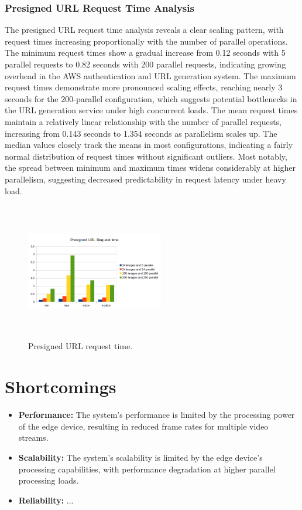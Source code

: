 \documentclass[conference]{IEEEtran}
\begin{document}
\subsubsection{Presigned URL Request Time Analysis}
The presigned URL request time analysis reveals a clear scaling pattern, with request times increasing proportionally with the number of parallel operations. The minimum request times show a gradual increase from 0.12 seconds with 5 parallel requests to 0.82 seconds with 200 parallel requests, indicating growing overhead in the AWS authentication and URL generation system. The maximum request times demonstrate more pronounced scaling effects, reaching nearly 3 seconds for the 200-parallel configuration, which suggests potential bottlenecks in the URL generation service under high concurrent loads. The mean request times maintain a relatively linear relationship with the number of parallel requests, increasing from 0.143 seconds to 1.354 seconds as parallelism scales up. The median values closely track the means in most configurations, indicating a fairly normal distribution of request times without significant outliers. Most notably, the spread between minimum and maximum times widens considerably at higher parallelism, suggesting decreased predictability in request latency under heavy load.
\begin{figure}[ht]	
	\centering
	\includegraphics[width=6cm,height=6cm,keepaspectratio]{images/measurements_cloud/presigned_url_request_time.png}
	\caption{Presigned URL request time.}
	\label{presigned-url-request-time}
\end{figure}

\section{Shortcomings}

\begin{itemize}
      \item \textbf{Performance:} The system's performance is limited by the processing power of the edge device, resulting in reduced frame rates for multiple video streams.
      \item \textbf{Scalability:} The system's scalability is limited by the edge device's processing capabilities, with performance degradation at higher parallel processing loads.
      \item \textbf{Reliability:} ...
\end{itemize}
\end{document}
